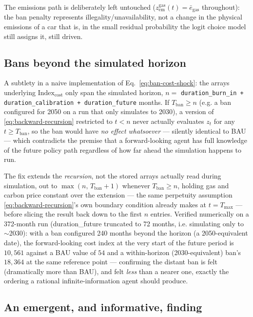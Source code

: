 \documentclass[11pt]{article}
\newcommand{\code}[1]{\texttt{#1}}
\begin{document}
The emissions path is deliberately left untouched
($z^{\mathrm{gas}}_{\mathrm{em}}(t) = \bar e_{\mathrm{gas}}$ throughout): the
ban penalty represents illegality/unavailability, not a change in the
physical emissions of a car that is, in the small residual probability the
logit choice model still assigns it, still driven.

\subsection{Bans beyond the simulated horizon}
\label{sec:ban-horizon}

A subtlety in a naive implementation of Eq.~\eqref{eq:ban-cost-shock}: the
arrays underlying $\mathrm{Index}_{\mathrm{cost}}$ only span the simulated
horizon, $n = $ \code{duration\_burn\_in + duration\_calibration +
duration\_future} months. If $T_{\mathrm{ban}} \ge n$ (e.g. a ban configured
for 2050 on a run that only simulates to 2030), a version of
\eqref{eq:backward-recursion} restricted to $t<n$ never actually evaluates
$z_t$ for any $t\ge T_{\mathrm{ban}}$, so the ban would have \emph{no effect
whatsoever} — silently identical to BAU — which contradicts the premise
that a forward-looking agent has full knowledge of the future policy path
regardless of how far ahead the simulation happens to run.

The fix extends the \emph{recursion}, not the stored arrays actually read
during simulation, out to $\max(n,\, T_{\mathrm{ban}}+1)$ whenever
$T_{\mathrm{ban}}\ge n$, holding gas and carbon price constant over the
extension — the same perpetuity assumption
\eqref{eq:backward-recursion}'s own boundary condition already makes at
$t=T_{\max}$ — before slicing the result back down to the first $n$
entries. Verified numerically on a 372-month run (duration\_future
truncated to 72 months, i.e. simulating only to $\sim$2030): with a ban
configured 240 months beyond the horizon (a 2050-equivalent date), the
forward-looking cost index at the very start of the future period is
$10{,}561$ against a BAU value of $54$ and a within-horizon
(2030-equivalent) ban's $18{,}364$ at the same reference point ---
confirming the distant ban is felt (dramatically more than BAU), and felt
\emph{less} than a nearer one, exactly the ordering a rational
infinite-information agent should produce.

\subsection{An emergent, and informative, finding}
\label{sec:ban-emergent-finding}
\end{document}
